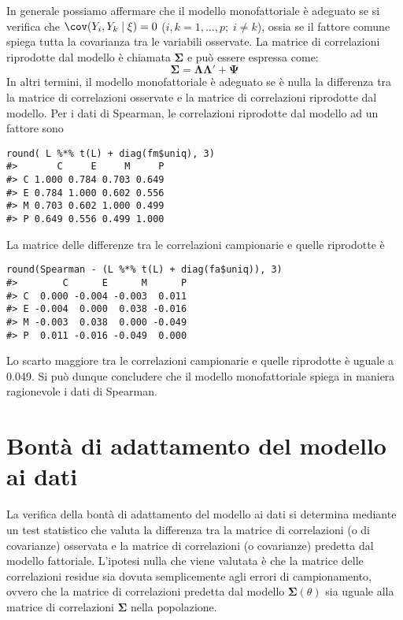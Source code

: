 In generale possiamo affermare che il modello monofattoriale
è adeguato se si verifica che $\cov(Y_i, Y_k \mid \xi) = 0$ ($i, k = 1, \dots,p; \; i\neq k$), ossia se il 
fattore comune spiega tutta la covarianza tra le variabili osservate. 
 La matrice di correlazioni riprodotte dal modello è chiamata
  $\boldsymbol{\Sigma}$ e può essere espressa come:
$$
\boldsymbol{\Sigma} = \boldsymbol{\Lambda} \boldsymbol{\Lambda}' + \boldsymbol{\Psi}
$$
 In altri termini, il modello monofattoriale
è adeguato se è nulla la differenza tra la matrice di correlazioni osservate e
la matrice di correlazioni riprodotte dal modello.
Per i dati di Spearman, le correlazioni riprodotte dal modello ad un fattore sono 
\begin{lstlisting}
round( L %*% t(L) + diag(fm$uniq), 3)
#>       C     E     M     P
#> C 1.000 0.784 0.703 0.649
#> E 0.784 1.000 0.602 0.556
#> M 0.703 0.602 1.000 0.499
#> P 0.649 0.556 0.499 1.000
\end{lstlisting}
La matrice delle differenze tra le correlazioni campionarie e quelle riprodotte è 
\begin{lstlisting}
round(Spearman - (L %*% t(L) + diag(fa$uniq)), 3)
#>        C      E      M      P
#> C  0.000 -0.004 -0.003  0.011
#> E -0.004  0.000  0.038 -0.016
#> M -0.003  0.038  0.000 -0.049
#> P  0.011 -0.016 -0.049  0.000
\end{lstlisting}
 Lo scarto maggiore tra le correlazioni campionarie e quelle riprodotte {\`e} uguale a 0.049. 
 Si può dunque concludere che il modello monofattoriale spiega in maniera ragionevole i dati di Spearman.

\section{Bontà di adattamento del modello ai dati}

La verifica della bontà di adattamento del modello ai dati si determina
mediante un test statistico che valuta la differenza tra la matrice di correlazioni (o
di covarianze) osservata e la matrice di correlazioni (o covarianze)
predetta dal modello fattoriale.
 L'ipotesi nulla che viene valutata è che la matrice delle correlazioni residue
sia dovuta semplicemente agli errori di campionamento, ovvero che 
la matrice di correlazioni predetta dal modello 
$\boldsymbol{\Sigma}(\theta)$ sia uguale alla matrice di correlazioni $\boldsymbol{\Sigma}$ nella popolazione.

